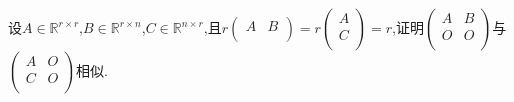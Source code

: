 \documentclass[../../main.tex]{subfiles}%
\begin{document}
\begin{example}
设$A\in \mathbb{R} ^{r\times r}$,$B\in \mathbb{R} ^{r\times n}$,$C\in \mathbb{R} ^{n\times r}$,且$r\left( \begin{matrix}
A&	B\\
\end{matrix} \right) =r\left( \begin{array}{c}
A\\
C\\
\end{array} \right) =r$,证明$\left( \begin{matrix}
A&	B\\
O&	O\\
\end{matrix} \right)$与$\left( \begin{matrix}
A&	O\\
C&	O\\
\end{matrix} \right)$相似.
\end{example}
\end{document}
